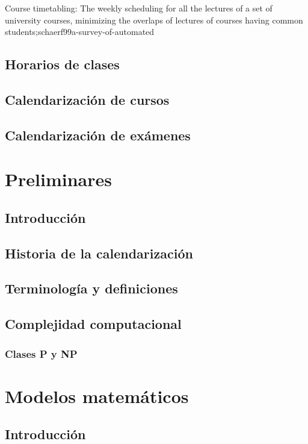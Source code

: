 \documentclass[draft,12pt,headsepline,footsepline,paper=letter]{scrreprt}
\begin{document}
Course timetabling: The weekly scheduling for all the lectures of a set of university courses, minimizing the overlaps of lectures of courses having common students;{schaerf99a-survey-of-automated}
\fi

\section{Horarios de clases}

\section{Calendarización de cursos}

\section{Calendarización de exámenes}

\chapter{Preliminares}

\section{Introducción}

\section{Historia de la calendarización}

\section{Terminología y definiciones}

\section{Complejidad computacional}

\subsection{Clases P y NP}

\chapter{Modelos matemáticos}

\section{Introducción}
\end{document}
